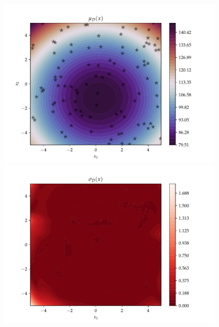 \begin{figure}[h]
  \centering
  \begin{minipage}[b]{0.49\textwidth}
   \includegraphics[trim=1.2cm 0.7cm 2cm 1cm,clip,width=\textwidth]{Figures/coco_reg/f1_numpyro neural network200-2002.pdf}
  \end{minipage}
  \hfill
  \begin{minipage}[b]{0.49\textwidth}
    \includegraphics[trim=1.2cm 0.7cm 2cm 1cm,clip,width=\textwidth]{Figures/coco_reg/f1_numpyro neural network200-2003.pdf}
   \end{minipage}
  


\end{figure}
